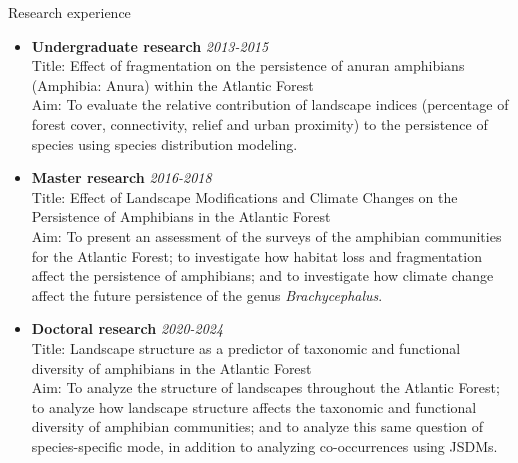\documentclass{resume}
\begin{document}
\begin{rSection}{Research experience}
\begin{itemize}
\item {\bf Undergraduate research} \hfill{\em 2013-2015}\\
Title: Effect of fragmentation on the persistence of anuran amphibians (Amphibia: Anura) within the Atlantic Forest\\
Aim: To evaluate the relative contribution of landscape indices (percentage of forest cover, connectivity, relief and urban proximity) to the persistence of species using species distribution modeling.

\item {\bf Master research} \hfill{\em 2016-2018}\\
Title: Effect of Landscape Modifications and Climate Changes on the Persistence of Amphibians in the Atlantic Forest\\
Aim: To present an assessment of the surveys of the amphibian communities for the Atlantic Forest; to investigate how habitat loss and fragmentation affect the persistence of amphibians; and to investigate how climate change affect the future persistence of the genus {\it Brachycephalus}.

\item {\bf Doctoral research} \hfill{\em 2020-2024}\\
Title: Landscape structure as a predictor of taxonomic and functional diversity of amphibians in the Atlantic Forest\\
Aim: To analyze the structure of landscapes throughout the Atlantic Forest; to analyze how landscape structure affects the taxonomic and functional diversity of amphibian communities; and to analyze this same question of species-specific mode, in addition to analyzing co-occurrences using JSDMs.
\end{itemize}
\end{rSection}

\end{document}
